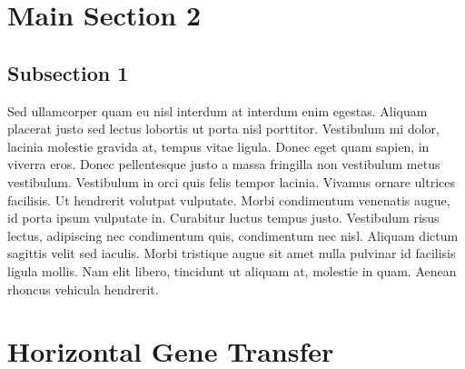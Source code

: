 
\section{Main Section 2}

\subsection{Subsection 1}
Sed ullamcorper quam eu nisl interdum at interdum enim egestas. Aliquam placerat justo sed lectus lobortis ut porta nisl porttitor. Vestibulum mi dolor, lacinia molestie gravida at, tempus vitae ligula. Donec eget quam sapien, in viverra eros. Donec pellentesque justo a massa fringilla non vestibulum metus vestibulum. Vestibulum in orci quis felis tempor lacinia. Vivamus ornare ultrices facilisis. Ut hendrerit volutpat vulputate. Morbi condimentum venenatis augue, id porta ipsum vulputate in. Curabitur luctus tempus justo. Vestibulum risus lectus, adipiscing nec condimentum quis, condimentum nec nisl. Aliquam dictum sagittis velit sed iaculis. Morbi tristique augue sit amet nulla pulvinar id facilisis ligula mollis. Nam elit libero, tincidunt ut aliquam at, molestie in quam. Aenean rhoncus vehicula hendrerit.




\section{Horizontal Gene Transfer}

